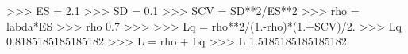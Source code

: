 
>>> ES = 2.1
>>> SD = 0.1
>>> SCV = SD**2/ES**2
>>> rho = labda*ES
>>> rho
0.7
>>>
>>> Lq = rho**2/(1.-rho)*(1.+SCV)/2.
>>> Lq
0.8185185185185182
>>> L = rho + Lq
>>> L
1.5185185185185182

